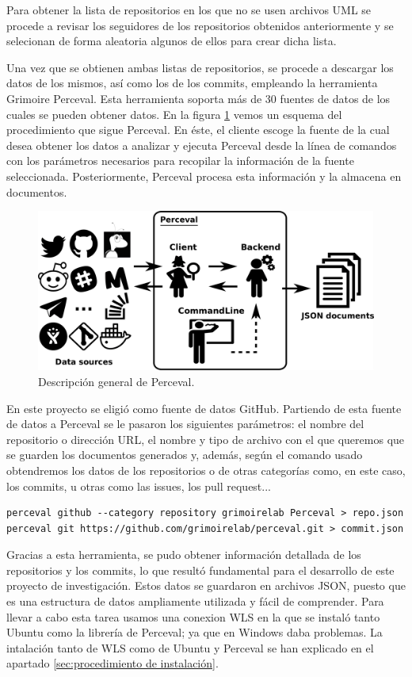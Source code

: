 \documentclass[a4paper, 12pt]{book}
\begin{document}
Para obtener la lista de repositorios en los que no se usen archivos UML se procede a revisar los seguidores de los repositorios obtenidos anteriormente y se selecionan de forma aleatoria algunos de ellos para crear dicha lista.


Una vez que se obtienen ambas listas de repositorios, se procede a descargar los datos de los mismos, así como los de los commits, empleando la herramienta Grimoire Perceval.
Esta herramienta soporta más de 30 fuentes de datos de los cuales se pueden obtener datos.
En la figura \ref{fig:perceval-json} vemos un esquema del procedimiento que sigue Perceval. 
En éste, el cliente escoge la fuente de la cual desea obtener los datos a analizar y ejecuta Perceval desde la línea de comandos con los parámetros necesarios para recopilar la información de la fuente seleccionada.
Posteriormente, Perceval procesa esta información y la almacena en documentos. 

\begin{figure}
  \centering
  \includegraphics[width=12cm, keepaspectratio]{img/perceval-json.png}
  \caption{Descripción general de Perceval.}\label{fig:perceval-json}
\end{figure}

En este proyecto se eligió como fuente de datos GitHub. 
Partiendo de esta fuente de datos a Perceval se le pasaron los siguientes parámetros: el nombre del repositorio o dirección URL, el nombre y tipo de archivo con el que queremos que se guarden los documentos generados y, además, según el comando usado obtendremos los datos de los repositorios o de otras categorías como, en este caso, los commits, u otras como las issues, los pull request...
\begin{verbatim}
perceval github --category repository grimoirelab Perceval > repo.json
perceval git https://github.com/grimoirelab/perceval.git > commit.json
\end{verbatim} 
    

Gracias a esta herramienta, se pudo obtener información detallada de los repositorios y los commits, lo que resultó fundamental para el desarrollo de este proyecto de investigación.
Estos datos se guardaron en archivos JSON, puesto que es una estructura de datos ampliamente utilizada y fácil de comprender.
Para llevar a cabo esta tarea usamos una conexion WLS en la que se instaló tanto Ubuntu como la librería de Perceval; ya que en Windows daba problemas.
La intalación tanto de WLS como de Ubuntu y Perceval se han explicado en el apartado \ref{sec:procedimiento de instalación}.
\end{document}

